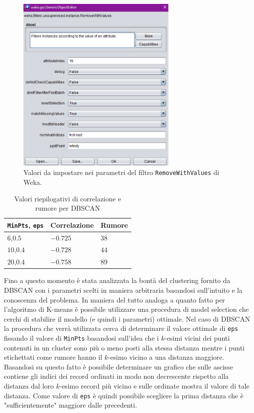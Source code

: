 \documentclass[12pt]{article}
\begin{document}
\begin{figure}[H]
\centering
	\includegraphics[width=0.7\textwidth]{img/filter-for-remove-noise.pdf}
	\caption{Valori da impostare nei parametri del filtro \texttt{RemoveWithValues} di Weka.}
	\label{fig:remove-noise}
\end{figure}

\begin{table}[H]
\centering
\begin{tabular}{@{}lll@{}}
\toprule	
\texttt{MinPts}, \texttt{eps} & Correlazione & Rumore \\ \hline
$6$,$0.5$       & $-0.725$  & $38$     \\ 
$10$,$0.4$      & $-0.728$  & $44$     \\ 
$20$,$0.4$      & $-0.758$  & $89$     \\ \bottomrule
\end{tabular}
\caption{Valori riepilogativi di correlazione e rumore per DBSCAN}
\label{tab:corr-noise-dbscan}
\end{table}

Fino a questo momento è stata analizzata la bontà del clustering fornito da DBSCAN con i parametri scelti in maniera arbitraria basandosi sull'in\-tuito e la conoscenza del problema. 
In maniera del tutto analoga a quanto fatto per l'algoritmo di K-means è possibile utilizzare una procedura di model selection che cerchi di stabilire il modello (e quindi i parametri) ottimale. Nel caso di DBSCAN la procedura che verrà utilizzata cerca di determinare il valore ottimale di \texttt{eps} fissando il valore di \texttt{MinPts} basandosi sull'idea che i $k$-esimi vicini dei punti contenuti in un cluster sono più o meno posti alla stessa distanza mentre i punti etichettati come rumore hanno il $k$-esimo vicino a una distanza maggiore. 
Basandosi su questo fatto è possibile determinare un grafico che sulle ascisse contiene gli indici dei record ordinati in modo non decrescente rispetto alla distanza dal loro $k$-esimo record più vicino e sulle ordinate mostra il valore di tale distanza. 
Come valore di \texttt{eps} è quindi possibile scegliere la prima distanza che è "sufficientemente" maggiore dalle precedenti. 
\end{document}
